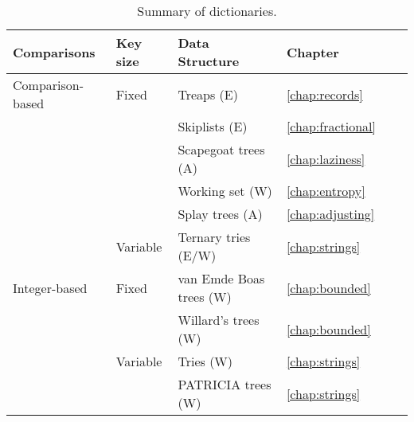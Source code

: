 \begin{table}
\begin{center}
\begin{tabular}{|l|l|l|l|l|l|}\hline
Comparisons & Key size & Data Structure & Chapter \\ \hline\hline
Comparison-based & Fixed  & Treaps (E) & \ref{chap:records} \\
                 &                 & Skiplists (E) & \ref{chap:fractional} \\
                 &                 & Scapegoat trees (A) & \ref{chap:laziness} \\
                 &                 & Working set (W) & \ref{chap:entropy} \\
                 &                 & Splay trees (A) & \ref{chap:adjusting} \\
                 & Variable  & Ternary tries (E/W) & 
			\ref{chap:strings} \\ \hline
Integer-based    & Fixed  & van Emde Boas trees (W) & 
			\ref{chap:bounded} \\
                 &                 & Willard's trees (W) & 
			\ref{chap:bounded} \\
                 & Variable  & Tries (W) & \ref{chap:strings} \\
                 &                    & PATRICIA trees (W) & \ref{chap:strings}
			\\ \hline 
\end{tabular}
\end{center}
\caption{Summary of dictionaries.}
\end{table}

